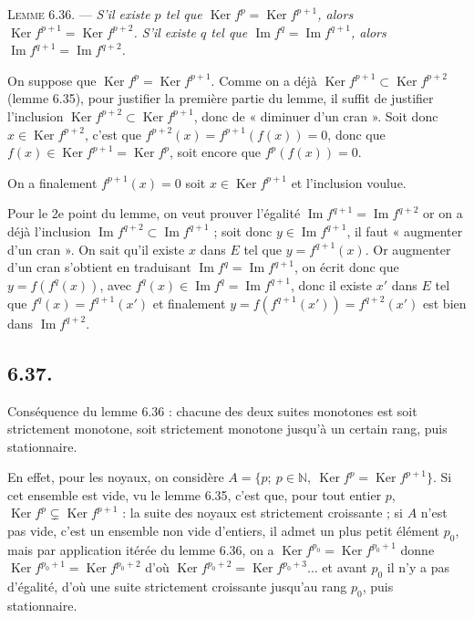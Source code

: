 \medskip\noindent\textsc{Lemme 6.36.} --- \emph{S'il existe $p$ tel que $\operatorname{Ker}f^p=\operatorname{Ker}f^{p+1}$, alors $\operatorname{Ker}f^{p+1}=\operatorname{Ker}f^{p+2}$. S'il existe $q$ tel que $\operatorname{Im}f^q=\operatorname{Im}f^{q+1}$, alors $\operatorname{Im}f^{q+1}=\operatorname{Im}f^{q+2}$.}

On suppose que $\operatorname{Ker}f^p=\operatorname{Ker}f^{p+1}$. Comme on a déjà $\operatorname{Ker}f^{p+1}\subset\operatorname{Ker}f^{p+2}$ (lemme 6.35), pour justifier la première partie du lemme, il suffit de justifier l'inclusion $\operatorname{Ker}f^{p+2}\subset\operatorname{Ker}f^{p+1}$, donc de « diminuer d'un cran ». Soit donc $x\in\operatorname{Ker}f^{p+2}$, c'est que $f^{p+2}(x)=f^{p+1}(f(x))=0$, donc que $f(x)\in\operatorname{Ker}f^{p+1}=\operatorname{Ker}f^p$, soit encore que $f^p(f(x))=0$.

On a finalement $f^{p+1}(x)=0$ soit $x\in\operatorname{Ker}f^{p+1}$ et l'inclusion voulue.

Pour le 2e point du lemme, on veut prouver l'égalité $\operatorname{Im}f^{q+1}=\operatorname{Im}f^{q+2}$ or on a déjà l'inclusion $\operatorname{Im}f^{q+2}\subset\operatorname{Im}f^{q+1}$ ; soit donc $y\in\operatorname{Im}f^{q+1}$, il faut « augmenter d'un cran ». On sait qu'il existe $x$ dans $E$ tel que $y=f^{q+1}(x)$. Or augmenter d'un cran s'obtient en traduisant $\operatorname{Im}f^q=\operatorname{Im}f^{q+1}$, on écrit donc que $y=f(f^q(x))$, avec $f^q(x)\in\operatorname{Im}f^q=\operatorname{Im}f^{q+1}$, donc il existe $x'$ dans $E$ tel que $f^q(x)=f^{q+1}(x')$ et finalement $y=f(f^{q+1}(x'))=f^{q+2}(x')$ est bien dans $\operatorname{Im}f^{q+2}$. \bookend

\subsection*{6.37.}
Conséquence du lemme 6.36 : chacune des deux suites monotones est soit strictement monotone, soit strictement monotone jusqu'à un certain rang, puis stationnaire.

En effet, pour les noyaux, on considère $A=\{p;\ p\in\mathbb N,\ \operatorname{Ker}f^p=\operatorname{Ker}f^{p+1}\}$. Si cet ensemble est vide, vu le lemme 6.35, c'est que, pour tout entier $p$, $\operatorname{Ker}f^p\subsetneq\operatorname{Ker}f^{p+1}$ : la suite des noyaux est strictement croissante ; si $A$ n'est pas vide, c'est un ensemble non vide d'entiers, il admet un plus petit élément $p_0$, mais par application itérée du lemme 6.36, on a $\operatorname{Ker}f^{p_0}=\operatorname{Ker}f^{p_0+1}$ donne $\operatorname{Ker}f^{p_0+1}=\operatorname{Ker}f^{p_0+2}$ d'où $\operatorname{Ker}f^{p_0+2}=\operatorname{Ker}f^{p_0+3}\ldots$ et avant $p_0$ il n'y a pas d'égalité, d'où une suite strictement croissante jusqu'au rang $p_0$, puis stationnaire.

